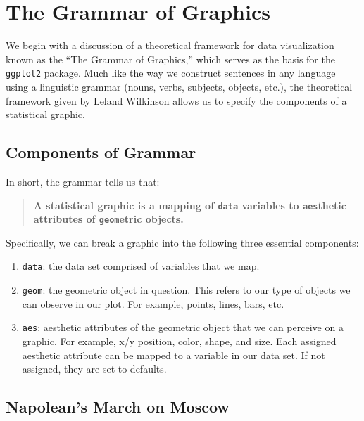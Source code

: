\documentclass[]{tufte-book}
\providecommand{\tightlist}{%
  \setlength{\itemsep}{0pt}\setlength{\parskip}{0pt}}
\begin{document}
\section{The Grammar of Graphics}\label{grammarofgraphics}

We begin with a discussion of a theoretical framework for data
visualization known as the ``The Grammar of Graphics,'' which serves as
the basis for the \texttt{ggplot2} package. Much like the way we
construct sentences in any language using a linguistic grammar (nouns,
verbs, subjects, objects, etc.), the theoretical framework given by
Leland Wilkinson \citep{wilkinson2005} allows us to specify the
components of a statistical graphic.

\subsection{Components of Grammar}\label{components-of-grammar}

In short, the grammar tells us that:

\begin{quote}
\textbf{A statistical graphic is a mapping of \texttt{data} variables to
\texttt{aes}thetic attributes of \texttt{geom}etric objects.}
\end{quote}

Specifically, we can break a graphic into the following three essential
components:

\begin{enumerate}
\def\labelenumi{\arabic{enumi}.}
\tightlist
\item
  \texttt{data}: the data set comprised of variables that we map.
\item
  \texttt{geom}: the geometric object in question. This refers to our
  type of objects we can observe in our plot. For example, points,
  lines, bars, etc.
\item
  \texttt{aes}: aesthetic attributes of the geometric object that we can
  perceive on a graphic. For example, x/y position, color, shape, and
  size. Each assigned aesthetic attribute can be mapped to a variable in
  our data set. If not assigned, they are set to defaults.
\end{enumerate}

\subsection{Napolean's March on Moscow}\label{napoleans-march-on-moscow}
\end{document}
